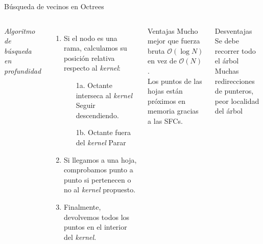 \documentclass[aspectratio=169]{beamer}
\begin{document}
\begin{frame}{Búsqueda de vecinos en Octrees}
    \begin{columns}
    \textit{Algoritmo de búsqueda en profundidad}
    \vspace{1em}
        \begin{enumerate}
            \item Si el nodo es una rama, calculamos su posición relativa respecto al \textit{kernel}:
            \begin{enumerate}
                \item[1a.] Octante interseca al \textit{kernel} \textrightarrow\: Seguir descendiendo.
                \item[1b.] Octante fuera del \textit{kernel} \textrightarrow\:  Parar
            \end{enumerate}
            \item Si llegamos a una hoja, comprobamos punto a punto si pertenecen o no al \textit{kernel} propuesto. 
            \item Finalmente, devolvemos todos los puntos en el interior del \textit{kernel}.
        \end{enumerate}
        \begin{exampleblock}{Ventajas}
            \textrightarrow \: Mucho mejor que fuerza bruta $\mathcal{O}(\log{N})$ en vez de $\mathcal{O}(N)$. \\
            \textrightarrow \: Los puntos de las hojas están próximos en memoria gracias a las SFCs. \\
        \end{exampleblock}
        \begin{alertblock}{Desventajas}
            \textrightarrow \: Se debe recorrer todo el árbol \\
            \textrightarrow \: Muchas redirecciones de punteros, peor localidad del árbol \\
        \end{alertblock}
    \end{columns}
\end{frame}
\end{document}

